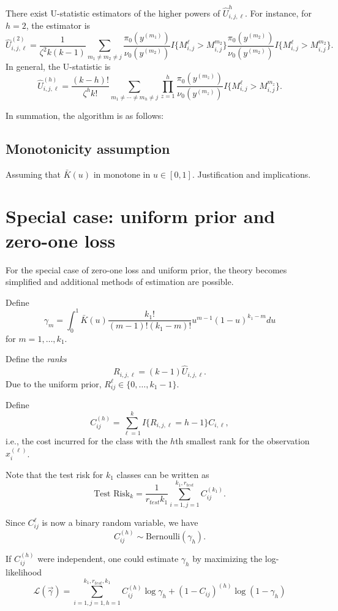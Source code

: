 \documentclass[12pt]{article}
\begin{document}
There exist U-statistic estimators of the higher powers of
$\hat{U}_{i,j,\ell}^h$.  For instance, for $h=2$, the estimator is
\[
\hat{U}_{i,j,\ell}^{(2)} = \frac{1}{\zeta^2 k(k-1)} \sum_{m_1\neq m_2 \neq j}  \frac{\pi_0(y^{(m_1)})}{\nu_0(y^{(m_2)})} I\{M_{i, j}^\ell > M_{i, j}^{m_2}\}
 \frac{\pi_0(y^{(m_2)})}{\nu_0(y^{(m_2)})} I\{M_{i, j}^\ell > M_{i, j}^{m_2}\}.
\]
In general, the U-statistic is
\[
\hat{U}_{i, j, \ell}^{(h)} = \frac{(k-h)!}{\zeta^h k!} \sum_{m_1 \neq \cdots \neq m_h \neq j} \prod_{z=1}^h  \frac{\pi_0(y^{(m_z)})}{\nu_0(y^{(m_z)})} I\{M_{i, j}^\ell > M_{i, j}^{m_z}\}.
\]

In summation, the algorithm is as follows:

\subsection{Monotonicity assumption}

Assuming that $\bar{K}(u)$ in monotone in $u \in [0,1]$.
Justification and implications.

\section{Special case: uniform prior and zero-one loss}

For the special case of zero-one loss and uniform prior, the theory
becomes simplified and additional methods of estimation are possible.

Define
\[
\gamma_m = \int_0^1 \bar{K}(u)  \frac{k_1!}{(m-1)!(k_1-m)!} u^{m-1} (1-u)^{k_1-m} du
\]
for $m = 1,\hdots, k_1$.

Define the \emph{ranks}
\[
R_{i, j, \ell} = (k-1)\hat{U}_{i, j, \ell}.
\]
Due to the uniform prior, $R_{ij}^\ell \in \{0,\hdots, k_1-1\}$.

Define
\[
C_{ij}^{(h)} = \sum_{\ell=1}^k I\{R_{i, j, \ell} = h - 1\} C_{i, \ell},
\]
i.e., the cost incurred for the class with the $h$th smallest rank for
the observation $x_i^{(\ell)}$.

Note that the test risk for $k_1$ classes can be written as
\[
\text{Test Risk}_k = \frac{1}{r_{test}k_1}\sum_{i=1,j=1}^{k_1,r_{test}} C_{ij}^{(k_1)}.
\]

Since $C_{ij}^\ell$ is now a binary random variable, we have
\[
C_{ij}^{(h)} \sim \text{Bernoulli}(\gamma_h).
\]

If $C_{ij}^{(h)}$ were independent, one could estimate $\gamma_h$ by
maximizing the log-likelihood
\begin{equation}\label{eq:pseudolikelihood1}
\mathcal{L}(\vec{\gamma}) = \sum_{i=1,j=1,h=1}^{k_1, r_{test}, k_1} C_{ij}^{(h)} \log \gamma_h + (1-C_{ij})^{(h)} \log (1-\gamma_h)
\end{equation}
\end{document}
